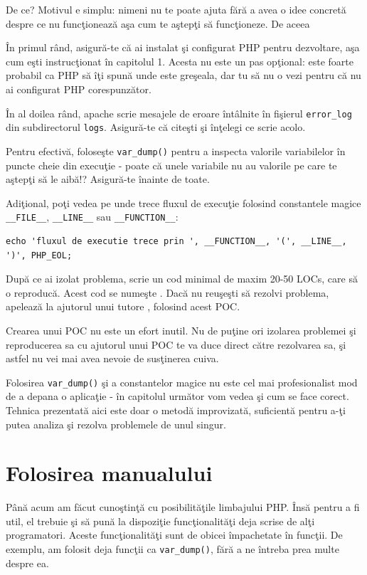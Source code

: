 De ce? Motivul e simplu: nimeni nu te poate ajuta fără
a avea o idee concretă despre ce nu funcţionează aşa cum te
aştepţi să funcţioneze. De aceea


În primul rând, asigură-te că ai instalat şi configurat PHP
pentru dezvoltare, aşa cum eşti instrucţionat în capitolul 1.
Acesta nu este un pas opţional: este foarte probabil ca PHP
să îţi spună unde este greşeala, dar tu să nu o vezi pentru
că nu ai configurat PHP corespunzător.

În al doilea rând, apache scrie mesajele de eroare întâlnite
în fişierul \texttt{error\_log} din subdirectorul \texttt{logs}.
Asigură-te că citeşti şi înţelegi ce scrie acolo.

Pentru  efectivă, foloseşte \texttt{var\_dump()}
pentru a inspecta valorile variabilelor în puncte
cheie din execuţie - poate că unele variabile nu au
valorile pe care te aştepţi să le aibă!? Asigură-te
înainte de toate.

Adiţional, poţi vedea pe unde trece fluxul de execuţie
folosind constantele magice \texttt{\_\_FILE\_\_},
\texttt{\_\_LINE\_\_} sau \texttt{\_\_FUNCTION\_\_}:
\begin{lstlisting}
echo 'fluxul de executie trece prin ', __FUNCTION__, '(', __LINE__, ')', PHP_EOL;
\end{lstlisting}

După ce ai izolat problema, scrie un cod minimal de maxim
20-50 LOCs, care să o reproducă. Acest cod se numeşte
. Dacă nu reuşeşti să rezolvi
problema, apelează la ajutorul unui tutore {\phpro},
folosind acest POC.

Crearea unui POC nu este un efort inutil. Nu de puţine ori
izolarea problemei şi reproducerea sa cu ajutorul
unui POC te va duce direct către rezolvarea sa,
şi astfel nu vei mai avea nevoie de susţinerea cuiva.

Folosirea \texttt{var\_dump()} şi a constantelor magice
nu este cel mai profesionalist mod de a depana o aplicaţie -
în capitolul următor vom vedea şi cum se face corect.
Tehnica prezentată aici este doar o metodă improvizată,
suficientă pentru a-ţi putea analiza şi rezolva
problemele de unul singur.

\section{Folosirea manualului}
Până acum am făcut cunoştinţă cu posibilităţile limbajului PHP.
Însă pentru a fi util, el trebuie şi să pună la dispoziţie
funcţionalităţi deja scrise de alţi programatori. Aceste
funcţionalităţi sunt de obicei împachetate în funcţii.
De exemplu, am folosit deja funcţii ca \texttt{var\_dump()},
fără a ne întreba prea multe despre ea.

